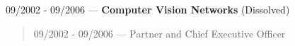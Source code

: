 09/2002 - 09/2006 --- {\bf Computer Vision Networks} (Dissolved)
\begin{quote}
09/2002 - 09/2006 --- Partner and Chief Executive Officer\\
\end{quote}
